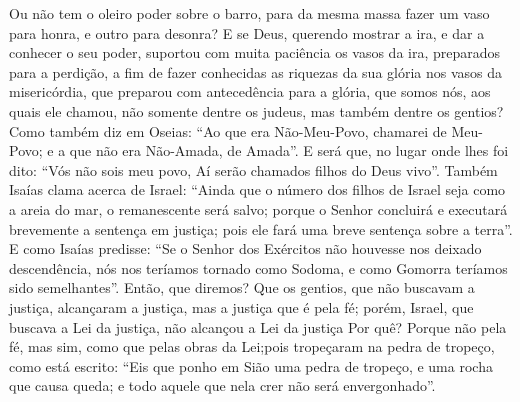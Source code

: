 {{{}}
Ou não tem o oleiro poder sobre o barro, para da mesma massa fazer um vaso para honra, e outro para desonra?
E se Deus, querendo mostrar a
{} ira, e dar a conhecer o seu poder, suportou com muita paciência os vasos da ira, preparados para a perdição,
a fim de fazer conhecidas as riquezas da sua glória nos vasos da misericórdia, que preparou com antecedência para a glória,
que somos nós, aos quais ele chamou, não somente dentre os judeus, mas também dentre os gentios?
Como também diz em Oseias: “Ao que era Não-Meu-Povo, chamarei de Meu-Povo; e a que não era Não-Amada,
{} de Amada”.
{}
E será que, no lugar onde lhes foi dito: “Vós não sois meu povo, Aí serão chamados filhos do Deus vivo”.
{}
Também Isaías clama acerca de Israel: “Ainda que o número dos filhos de Israel seja como a areia do mar,
{} o remanescente será salvo;
porque o Senhor concluirá e executará brevemente a sentença em justiça; pois ele fará uma breve sentença sobre a terra”.
E como Isaías predisse: “Se o Senhor dos Exércitos não houvesse nos deixado descendência,
 nós nos teríamos tornado como Sodoma, e como Gomorra teríamos sido semelhantes”.
{}
Então, que diremos? Que os gentios, que não buscavam a justiça, alcançaram a justiça, mas a justiça que é pela fé;
porém, Israel, que buscava a Lei da justiça, não alcançou a Lei da justiça
Por quê? Porque não
{} pela fé, mas sim, como que pelas obras da Lei;pois tropeçaram na pedra de tropeço,
como está escrito: “Eis que ponho em Sião uma pedra de tropeço, e uma rocha que causa queda;
 e todo aquele que nela crer não será envergonhado”.

}
